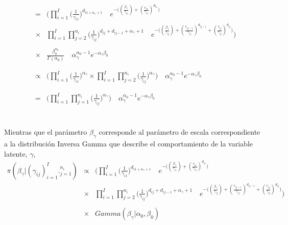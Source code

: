 \\
\begin{eqnarray*}
&=&\Bigg(\prod_{i=1}^I \bigg(\frac{1}{\gamma_{i1}}\bigg)^{d_{i1+\alpha_\gamma+1}}\quad e^{-\big((\frac{\beta_\gamma}{\gamma_{i1}})+(\frac{c_{i1}}{\gamma_{i1}})^{d_{i1}}\big)}\\
&\times& \prod_{i=1}^I \prod_{j=2}^{n_i} \bigg(\frac{1}{\gamma_{ij}}\bigg)^{d_{ij}+d_{ij-1}+\alpha_\gamma+1}\quad e^{-\big((\frac{\beta_\gamma}{\gamma_{ij}})+(\frac{c_{ij-1}}{\gamma_{ij}})^{d_{ij-1}}+(\frac{c_{ij}}{\gamma_{ij}})^{d_{ij}}\big)}\Bigg)\\
\\
&\times& \frac{\beta_0^{\alpha_0}}{\Gamma(\alpha_0)} \quad \alpha_\gamma^{\alpha_0-1} e^{-\alpha_\gamma\beta_0}\\
\\
\\
&\propto& \Bigg(\prod_{i=1}^I \Big(\frac{1}{\gamma_{i1}}\Big)^{\alpha_\gamma} \times \prod_{i=1}^I \prod_{j=2}^{n_i}\Big(\frac{1}{\gamma_{ij}}\Big)^{\alpha_\gamma}\Bigg)\quad \alpha_\gamma^{\alpha_0-1}e^{-\alpha_\gamma\beta_0}\\
\\
\\
&=&\Bigg(\prod_{i=1}^I \prod_{j=1}^{n_i} \Big(\frac{1}{\gamma_{ij}}\Big)^{\alpha_\gamma}\Bigg) \quad \alpha_\gamma^{\alpha_0-1}e^{-\alpha_\gamma\beta_0}
\end{eqnarray*}
\\
\\
Mientras que el par\'ametro $\beta_\gamma$ corresponde al par\'ametro de escala correspondiente a la distribuci\'on Inversa Gamma que describe el comportamiento de la variable latente, $\gamma$,\\
\begin{eqnarray*}
\pi(\beta_\gamma|(\gamma_{ij})_{i=1}^I._{j=1}^{n_i}) &\propto& \Bigg(\prod_{i=1}^I \bigg(\frac{1}{\gamma_{i1}}\bigg)^{d_{i1+\alpha_\gamma+1}}\quad e^{-\big((\frac{\beta_\gamma}{\gamma_{i1}})+(\frac{c_{i1}}{\gamma_{i1}})^{d_{i1}}\big)}\\
&\times& \prod_{i=1}^I \prod_{j=2}^{n_i} \bigg(\frac{1}{\gamma_{ij}}\bigg)^{d_{ij}+d_{ij-1}+\alpha_\gamma+1}\quad e^{-\big((\frac{\beta_\gamma}{\gamma_{ij}})+(\frac{c_{ij-1}}{\gamma_{ij}})^{d_{ij-1}}+(\frac{c_{ij}}{\gamma_{ij}})^{d_{ij}}\big)}\Bigg) \\
\\
&\times& Gamma(\beta_\gamma|\alpha_0,\beta_0)
\end{eqnarray*}
\\
